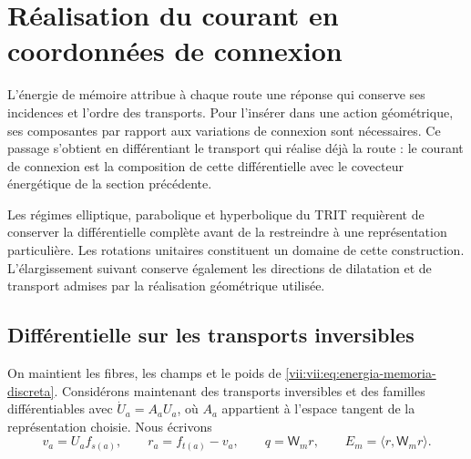 
\section{Réalisation du courant en coordonnées de connexion}
\label{vii:vii:sec:composicion-corriente-conexion}

L'énergie de mémoire attribue à chaque route une réponse qui conserve ses incidences et l'ordre des transports. Pour l'insérer dans une action géométrique, ses composantes par rapport aux variations de connexion sont nécessaires. Ce passage s'obtient en différentiant le transport qui réalise déjà la route : le courant de connexion est la composition de cette différentielle avec le covecteur énergétique de la section précédente.

Les régimes elliptique, parabolique et hyperbolique du TRIT requièrent de
conserver la différentielle complète avant de la restreindre à une
représentation particulière. Les rotations unitaires constituent un
domaine de cette construction. L'élargissement suivant conserve également
les directions de dilatation et de transport admises par la réalisation
géométrique utilisée.

\subsection{Différentielle sur les transports inversibles}

On maintient les fibres, les champs et le poids de
\eqref{vii:vii:eq:energia-memoria-discreta}. Considérons maintenant des transports
inversibles et des familles différentiables avec
\(\dot U_a=A_aU_a\), où \(A_a\) appartient à l'espace tangent
de la représentation choisie. Nous écrivons
\[
 v_a=U_af_{s(a)},\qquad r_a=f_{t(a)}-v_a,\qquad
 q=\mathsf W_mr,\qquad E_m=\langle r,\mathsf W_mr\rangle.
\]

